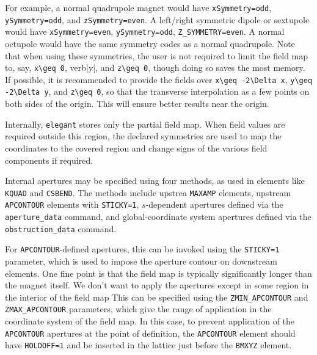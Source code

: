 For example, a normal quadrupole magnet would have
\verb|xSymmetry=odd|, \verb|ySymmetry=odd|, and \verb|zSymmetry=even|.  A left/right symmetric dipole or sextupole
would have \verb|xSymmetry=even|, \verb|ySymmetry=odd|,
\verb|Z_SYMMETRY=even|.  A normal octupole would have the same symmetry codes as a normal quadrupole.
Note that when using these symmetries, the user is not required to limit the field map to, say, 
\verb|x\geq 0|, verb|y|, and \verb|z\geq 0|, though doing so saves the most memory.
If possible, it is recommended to provide the fields over \verb|x\geq -2\Delta x|, \verb|y\geq -2\Delta y|, 
and \verb|z\geq 0|, so that the transverse interpolation as a few points on both sides of the origin.
This will ensure better results near the origin.

Internally, {\tt elegant} stores only the partial field map. When field values are required outside this region, the
declared symmetries are used to map the coordinates to the covered region and change signs of the various field
components if required.

Internal apertures may be specified using four methods, as used in elements like \verb|KQUAD| and
\verb|CSBEND|. The methods include upstrea \verb|MAXAMP| elements, upstream \verb|APCONTOUR| elements
with \verb|STICKY=1|, $s$-dependent apertures defined via the \verb|aperture_data| command,
and global-coordinate system apertures defined via the \verb|obstruction_data| command.

For \verb|APCONTOUR|-defined apertures, this can be invoked using the \verb|STICKY=1| parameter,
which is used to impose the aperture contour on downstream elements.
One fine point is that the field map is typically significantly longer than the magnet itself.
We don't want to apply the apertures except in some region in the interior of the field map
This can be specified using the \verb|ZMIN_APCONTOUR| and \verb|ZMAX_APCONTOUR| parameters,
which give the range of application in the coordinate system of the field map.
In this case, to prevent application of the \verb|APCONTOUR| apertures at the point of 
definition, the \verb|APCONTOUR| element should have \verb|HOLDOFF=1| and be inserted
in the lattice just before the \verb|BMXYZ| element.

